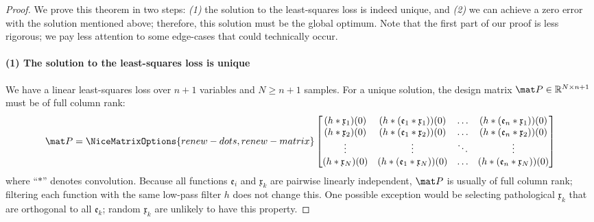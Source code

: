 \begin{proof}
We prove this theorem in two steps: \emph{(1)} the solution to the least-squares loss is indeed unique, and \emph{(2)} we can achieve a zero error with the solution mentioned above; therefore, this solution must be the global optimum.
Note that the first part of our proof is less rigorous; we pay less attention to some edge-cases that could technically occur.

\paragraph{(1) The solution to the least-squares loss is unique}
We have a linear least-squares loss over $n + 1$ variables and $N \geq n + 1$ samples.
For a unique solution, the design matrix $\mat P \in \mathbb{R}^{N \times {n + 1}}$ must be of full column rank:
\begin{align*}
	\mat P =
	\NiceMatrixOptions{renew-dots,renew-matrix}
	\begin{bmatrix}
			(h \ast \mathfrak{x}_1)(0)
		&	(h \ast (\mathfrak{e}_1 \ast \mathfrak{x}_1))(0)
		&	\ldots
		&	(h \ast (\mathfrak{e}_n \ast \mathfrak{x}_1))(0) \\
			(h \ast \mathfrak{x}_2)(0)
		&	(h \ast (\mathfrak{e}_1 \ast \mathfrak{x}_2))(0)
		&	\ldots
		&	(h \ast (\mathfrak{e}_n \ast \mathfrak{x}_2))(0) \\
		\vdots & \vdots & \ddots & \vdots\\
			(h \ast \mathfrak{x}_N)(0)
		&	(h \ast (\mathfrak{e}_1 \ast \mathfrak{x}_N))(0)
		&	\ldots
		&	(h \ast (\mathfrak{e}_n \ast \mathfrak{x}_N))(0)
	\end{bmatrix}
\end{align*}
where \enquote{$\ast$} denotes convolution.
Because all functions $\mathfrak{e}_i$ and $\mathfrak{x}_k$ are pairwise linearly independent, $\mat P$ is usually of full column rank; filtering each function with the same low-pass filter $h$ does not change this.
One possible exception would be selecting pathological $\mathfrak{x}_k$ that are orthogonal to all $\mathfrak{e}_k$; random $\mathfrak{x}_k$ are unlikely to have this property.


\end{proof}
